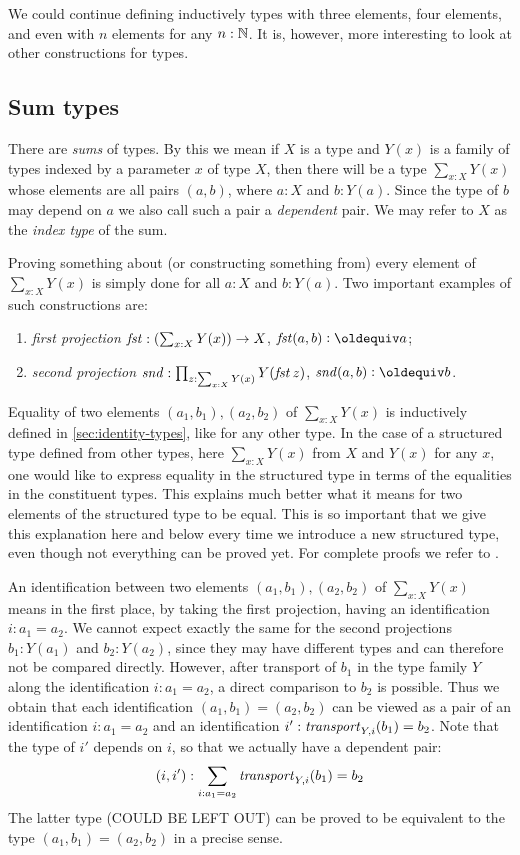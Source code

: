 We could continue defining inductively types with three elements, 
four elements, and even with $n$ elements for any $n:\mathbb{N}$. It is,
however, more interesting to look at other constructions for types.

\subsection{Sum types}
\label{sec:sum-types}
There are \emph{sums} of types.  By this we mean if $X$ is a type and $Y(x)$ is a family of types indexed by a parameter $x$ of type $X$, then
there will be a type $\sum _{x:X} Y(x)$ whose elements are all pairs $(a,b)$, where $a:X$ and $b:Y(a)$. Since the type of $b$ may depend on $a$ we also call such a pair
a \emph{dependent} pair. We may refer to $X$ as the \emph{index
  type} of the sum.  

Proving something about (or constructing something from) 
every element of $\sum _{x:X} Y(x)$ is simply done for all $a:X$ and $b: Y(a)$.
Two important examples of such constructions are:
\begin{enumerate}
\item \emph{first projection} $\mathop{\mathit{fst}}:(\sum _{x:X} Y(x)) \to X$, 
$\fst(a,b)\defeq a$;
\item \emph{second projection}
$\mathop{\mathit{snd}}: \prod_{z: \sum _{x:X} Y(x)} Y(\mathop{\mathit{fst}} z)$, $\snd(a,b)\defeq b$.
\end{enumerate}

Equality of two elements $(a_1,b_1),(a_2,b_2)$ of $\sum _{x:X} Y(x)$ is 
inductively defined in \cref{sec:identity-types}, like for any other type.
In the case of a structured type defined from other types, 
here $\sum _{x:X} Y(x)$ from $X$ and $Y(x)$ for any $x$,
one would like to express equality in the structured type in terms of 
the equalities in the constituent types. This explains much better
what it means for two elements of the structured type to be equal.
This is so important that we give this explanation here and below
every time we introduce a new structured type, even though not everything
can be proved yet. For complete proofs we refer to \cite{hottbook}.

An identification between two elements $(a_1,b_1),(a_2,b_2)$ of 
$\sum _{x:X} Y(x)$ means in the first place, by taking
the first projection, having an identification $i: a_1=a_2$.
We cannot expect exactly the same for the second 
projections $b_1: Y(a_1)$ and $b_2: Y(a_2)$, since they may
have different types and can therefore not be compared directly.
However, after transport of $b_1$ in the type family $Y$
along the identification $i: a_1=a_2$, a direct comparison to $b_2$
is possible. Thus we obtain that each identification $(a_1,b_1)=(a_2,b_2)$
can be viewed as a pair of an identification $i: a_1=a_2$ and an
identification $i' : \mathord{\mathit{transport}}_{Y,i}(b_1) = b_2$. Note that the type
of $i'$ depends on $i$, so that we actually have a dependent pair:
\[
(i,i'): \sum_{i:a_1 = a_2} \mathord{\mathit{transport}}_{Y,i}(b_1)= b_2
\]
The latter type (COULD BE LEFT OUT) can be proved to be equivalent to the
type $(a_1,b_1)=(a_2,b_2)$ in a precise sense.


